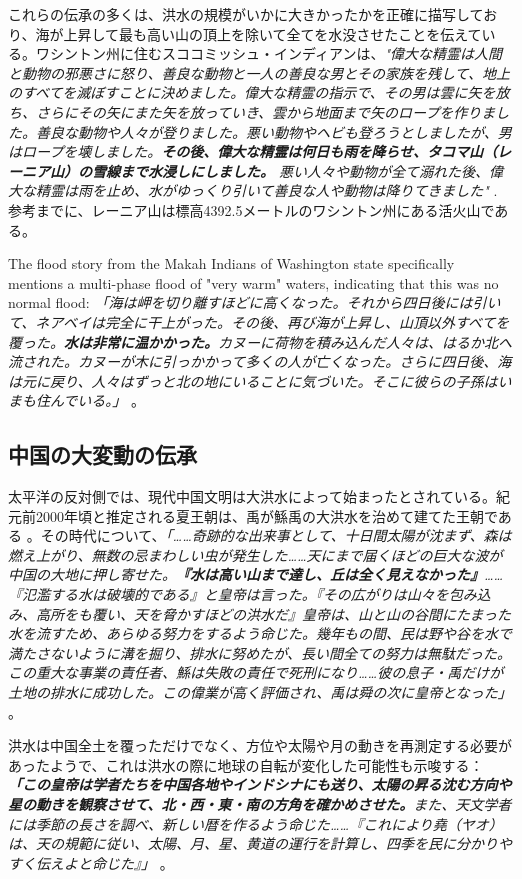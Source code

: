 \documentclass[10pt,twocolumn,letterpaper]{article}
\begin{document}
これらの伝承の多くは、洪水の規模がいかに大きかったかを正確に描写しており、海が上昇して最も高い山の頂上を除いて全てを水没させたことを伝えている。ワシントン州に住むスココミッシュ・インディアンは、\textit{"偉大な精霊は人間と動物の邪悪さに怒り、善良な動物と一人の善良な男とその家族を残して、地上のすべてを滅ぼすことに決めました。偉大な精霊の指示で、その男は雲に矢を放ち、さらにその矢にまた矢を放っていき、雲から地面まで矢のロープを作りました。善良な動物や人々が登りました。悪い動物やヘビも登ろうとしましたが、男はロープを壊しました。\textbf{その後、偉大な精霊は何日も雨を降らせ、タコマ山（レーニア山）の雪線まで水浸しにしました。} 悪い人々や動物が全て溺れた後、偉大な精霊は雨を止め、水がゆっくり引いて善良な人や動物は降りてきました"} \cite{3}. 参考までに、レーニア山は標高4392.5メートルのワシントン州にある活火山である。

The flood story from the Makah Indians of Washington state specifically mentions a multi-phase flood of "very warm" waters, indicating that this was no normal flood: \textit{「海は岬を切り離すほどに高くなった。それから四日後には引いて、ネアベイは完全に干上がった。その後、再び海が上昇し、山頂以外すべてを覆った。\textbf{水は非常に温かかった。}カヌーに荷物を積み込んだ人々は、はるか北へ流された。カヌーが木に引っかかって多くの人が亡くなった。さらに四日後、海は元に戻り、人々はずっと北の地にいることに気づいた。そこに彼らの子孫はいまも住んでいる。」} \cite{3}。

\subsection{中国の大変動の伝承}

太平洋の反対側では、現代中国文明は大洪水によって始まったとされている。紀元前2000年頃と推定される夏王朝は、禹が鯀禹の大洪水を治めて建てた王朝である \cite{6}。その時代について、\textit{「……奇跡的な出来事として、十日間太陽が沈まず、森は燃え上がり、無数の忌まわしい虫が発生した……天にまで届くほどの巨大な波が中国の大地に押し寄せた。\textbf{『水は高い山まで達し、丘は全く見えなかった』}……『氾濫する水は破壊的である』と皇帝は言った。『その広がりは山々を包み込み、高所をも覆い、天を脅かすほどの洪水だ』皇帝は、山と山の谷間にたまった水を流すため、あらゆる努力をするよう命じた。幾年もの間、民は野や谷を水で満たさないように溝を掘り、排水に努めたが、長い間全ての努力は無駄だった。この重大な事業の責任者、鯀は失敗の責任で死刑になり……彼の息子・禹だけが土地の排水に成功した。この偉業が高く評価され、禹は舜の次に皇帝となった」} \cite{5}。

洪水は中国全土を覆っただけでなく、方位や太陽や月の動きを再測定する必要があったようで、これは洪水の際に地球の自転が変化した可能性も示唆する：\textit{ \textbf{「この皇帝は学者たちを中国各地やインドシナにも送り、太陽の昇る沈む方向や星の動きを観察させて、北・西・東・南の方角を確かめさせた。}また、天文学者には季節の長さを調べ、新しい暦を作るよう命じた……『これにより堯（ヤオ）は、天の規範に従い、太陽、月、星、黄道の運行を計算し、四季を民に分かりやすく伝えよと命じた』」} \cite{5}。
\end{document}
